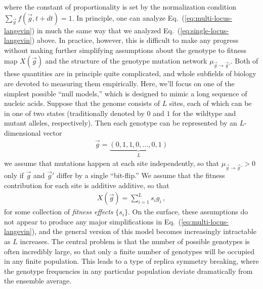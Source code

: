 \documentclass[11pt]{article}
\newcommand{\eq}[1]{Eq.~(\ref{#1})}
\begin{document}
where the constant of proportionality is set by the normalization condition $\sum_{\vec{g}} f(\vec{g},t+dt) = 1$. In principle, one can analyze \eq{eq:multi-locus-langevin} in much the same way that we analyzed \eq{eq:single-locus-langevin} above. In practice, however, this is difficult to make any progress without making further simplifying assumptions about the genotype to fitness map $X(\vec{g})$ and the structure of the genotype mutation network $\mu_{\vec{g} \to \vec{g}'}$. Both of these quantities are in principle quite complicated, and whole subfields of biology are devoted to measuring them empirically. Here, we'll focus on one of the simplest possible ``null models,'' which is designed to mimic a long sequence of nucleic acids. Suppose that the genome consists of $L$ sites, each of which can be in one of two states (traditionally denoted by $0$ and $1$ for the wildtype and mutant alleles, respectively). Then each genotype can be represented by an $L$-dimensional vector
\begin{align}
\vec{g} = \underbrace{(0,1,1,0,\ldots,0,1) }_{L} 
\end{align}
we assume that mutations happen at each site independently, so that $\mu_{\vec{g} \to \vec{g}'} > 0$ only if $\vec{g}$ and $\vec{g}'$ differ by a single ``bit-flip.'' We assume that the fitness contribution for each site is additive additive, so that 
\begin{align}
X(\vec{g}) = \sum_{i=1}^{L} s_i g_i \, , 
\end{align}
for some collection of \emph{fitness effects} $\{ s_i \}$. On the surface, these assumptions do not appear to produce any major simplifications in \eq{eq:multi-locus-langevin}, and the general version of this model becomes increasingly intractable as $L$ increases. The central problem is that the number of possible genotypes is often incredibly large, so that only a finite number of genotypes will be occupied in any finite population. This leads to a type of replica symmetry breaking, where the genotype frequencies in any particular population deviate dramatically from the ensemble average.  
\end{document}
